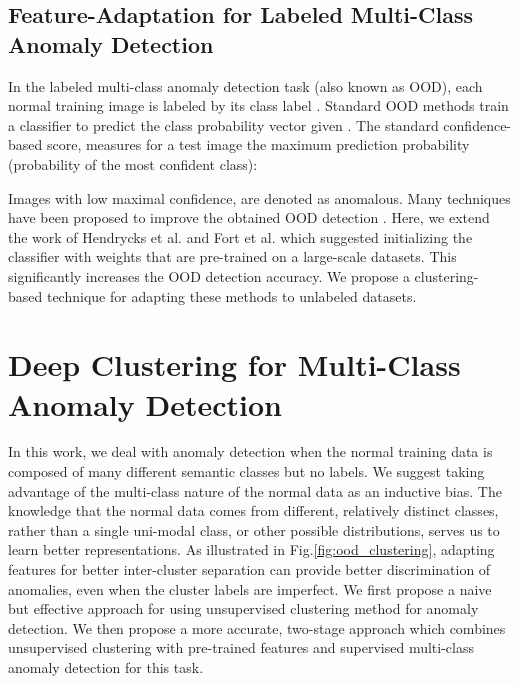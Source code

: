 \documentclass[runningheads]{llncs}
\begin{document}
\subsection{Feature-Adaptation for Labeled Multi-Class Anomaly Detection}
\label{subsec:background:ood}

In the labeled multi-class anomaly detection task (also known as OOD), each normal training image  is labeled by its class label . Standard OOD methods train a classifier  to predict the class probability vector  given . The standard confidence-based score, measures for a test image  the maximum prediction probability (probability of the most confident class):


Images with low maximal confidence, are denoted as anomalous. Many techniques have been proposed to improve the obtained OOD detection \cite{wei2022mitigating}. Here, we extend the work of Hendrycks et al. \cite{hendrycks2019using} and Fort et al. \cite{fort2021exploring} which suggested initializing the classifier  with weights that are pre-trained on a large-scale datasets. This significantly increases the OOD detection accuracy. We propose a clustering-based technique for adapting these methods to unlabeled datasets. 





\section{Deep Clustering for Multi-Class Anomaly Detection}
\label{sec:method}

In this work, we deal with anomaly detection when the normal training data is composed of many different semantic classes but no labels. We suggest taking advantage of the multi-class nature of the normal data as an inductive bias. The knowledge that the normal data comes from different, relatively distinct classes, rather than a single uni-modal class, or other possible distributions, serves us to learn better representations. As illustrated in Fig.\ref{fig:ood_clustering}, adapting features for better inter-cluster separation can provide better discrimination of anomalies, even when the cluster labels are imperfect. We first propose a naive but effective approach for using unsupervised clustering method for anomaly detection. We then propose a more accurate, two-stage approach which combines unsupervised clustering with pre-trained features and supervised multi-class anomaly detection for this task.
\end{document}
